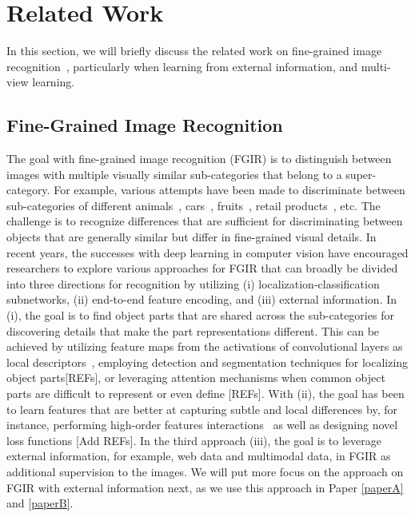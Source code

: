 \section{Related Work}\label{chap3:sec:related_work}

In this section, we will briefly discuss the related work on fine-grained image recognition~\cite{wei2021fine}, particularly when learning from external information, and multi-view learning. 

\subsection{Fine-Grained Image Recognition}
The goal with fine-grained image recognition (FGIR) is to distinguish between images with multiple visually similar sub-categories that belong to a super-category. For example, various attempts have been made to discriminate between sub-categories of different animals~\cite{van2018inaturalist}, cars~\cite{krause2013stanford_cars}, fruits~\cite{hou2017vegfru}, retail products~\cite{wei2019rpc}, etc. The challenge is to recognize differences that are sufficient for discriminating between objects that are generally similar but differ in fine-grained visual details. In recent years, the successes with deep learning in computer vision have encouraged researchers to explore various approaches for FGIR that can broadly be divided into three directions for recognition by utilizing (i) localization-classification subnetworks, (ii) end-to-end feature encoding, and (iii) external information. In (i), the goal is to find object parts that are shared across the sub-categories for discovering details that make the part representations different. This can be achieved by utilizing feature maps from the activations of convolutional layers as local descriptors~\cite{zhang2016picking, wang2018learning, ding2019selective}, employing detection and segmentation techniques for localizing object parts[REFs], or leveraging attention mechanisms when common object parts are difficult to represent or even define [REFs]. With (ii), the goal has been to learn features that are better at capturing subtle and local differences by, for instance, performing high-order features interactions~\cite{lin2015bilinear} as well as designing novel loss functions [Add REFs]. In the third approach (iii), the goal is to leverage external information, for example, web data and multimodal data, in FGIR as additional supervision to the images. We will put more focus on the approach on FGIR with external information next, as we use this approach in Paper \ref{paperA} and \ref{paperB}. 

